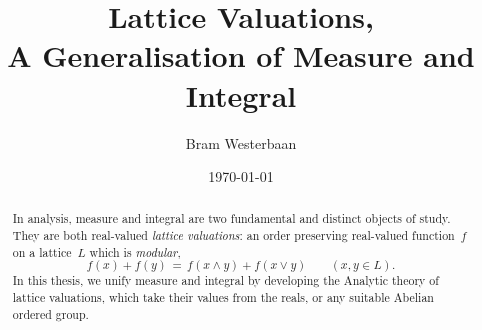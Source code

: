 \documentclass[
  a4paper,
  draft,
  twoside,
  reqno
]{amsart}
\begin{document}
\title[A Generalisation of Measure and Integral]{Lattice Valuations,\\
A Generalisation of Measure and Integral}

\author[A.A.~Westerbaan]{Bram Westerbaan}
\date{\today \quad{\tiny \version}}
\maketitle

\begin{abstract}
In analysis,
measure and integral are two fundamental
and distinct
objects of study.
They
 are both real-valued \emph{lattice valuations}:
an order preserving real-valued function~$f$
on a lattice~$L$
which is \emph{modular},
\begin{equation*}
f(x) + f(y) \,=\, f(x\wedge y) + f(x\vee y)\qquad(x,y\in L).
\end{equation*}
In this thesis,
we unify measure and integral
by developing the Analytic theory of lattice valuations,
which take their values from the reals,
or any suitable Abelian ordered group.
\end{abstract}

{  }

{}

\end{document}
